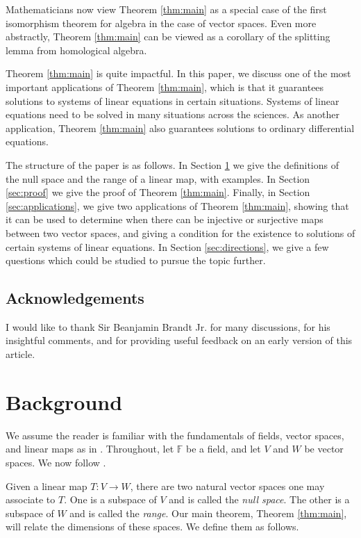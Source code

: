 \documentclass[11pt,reqno]{amsart}
\theoremstyle{definition}
\newcommand{\F}{\mathbb{F}}
\begin{document}
Mathematicians now view Theorem \ref{thm:main} as a special case of the first isomorphism theorem for algebra in the case of vector spaces. Even more abstractly, Theorem \ref{thm:main} can be viewed as a corollary of the splitting lemma from homological algebra. 

Theorem \ref{thm:main} is quite impactful. In this paper, we discuss one of the most important applications of Theorem \ref{thm:main}, which is that it guarantees solutions to systems of linear equations in certain situations. Systems of linear equations need to be solved in many situations across the sciences.
As another application, Theorem \ref{thm:main} also guarantees solutions to ordinary differential equations. 


The structure of the paper is as follows. In Section \ref{sec:background} we give the definitions of the null space and the range of a linear map, with examples. In Section \ref{sec:proof} we give the proof of Theorem \ref{thm:main}. Finally, in Section \ref{sec:applications}, we give two applications of Theorem \ref{thm:main}, showing that it can be used to determine when there can be injective or surjective maps between two vector spaces, and giving a condition for the existence to solutions of certain systems of linear equations. In Section \ref{sec:directions}, we give a few questions which could be studied to pursue the topic further.


\subsection*{Acknowledgements}
I would like to thank Sir Beanjamin Brandt Jr. for many discussions, for his insightful comments, and for providing useful feedback on an early version of this article.

\section{Background}
\label{sec:background}

We assume the reader is familiar with the fundamentals of fields, vector spaces, and linear maps as in \cite[Chapters 1, 2, and 3a]{axler}. Throughout, let $\F$ be a field, and let $V$ and $W$ be vector spaces. We now follow \cite[Chapter 3b]{axler}.

Given a linear map $T:V\rightarrow W$, there are two natural vector spaces one may associate to $T$. One is a subspace of $V$ and is called the \emph{null space}. The other is a subspace of $W$ and is called the \emph{range}. Our main theorem, Theorem \ref{thm:main}, will relate the dimensions of these spaces. We define them as follows.
\end{document}
